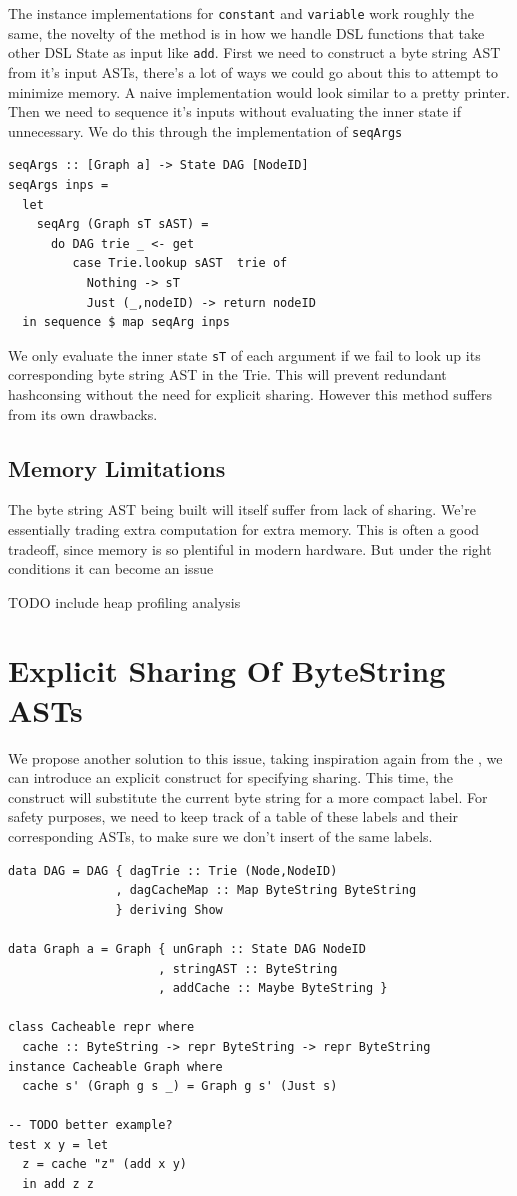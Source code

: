\documentclass[runningheads]{llncs}
\begin{document}
The instance implementations for \texttt{constant} and
\texttt{variable} work roughly the same, the novelty of the method
is in how we handle DSL functions that take other DSL State as input like
\texttt{add}. First we need to construct a byte string AST from
it's input ASTs, there's a lot of ways we could go about this to attempt to
minimize memory. A naive implementation would look similar to a pretty printer.
Then we need to sequence it's inputs without evaluating the inner state if
unnecessary. We do this through the implementation of \texttt{seqArgs}
\begin{verbatim}
seqArgs :: [Graph a] -> State DAG [NodeID]
seqArgs inps =
  let
    seqArg (Graph sT sAST) =
      do DAG trie _ <- get
         case Trie.lookup sAST  trie of
           Nothing -> sT
           Just (_,nodeID) -> return nodeID
  in sequence $ map seqArg inps
\end{verbatim}

We only evaluate the inner state \texttt{sT} of each argument if we
fail to look up its corresponding byte string AST in the Trie. This will prevent
redundant hashconsing without the need for explicit sharing. However this method
suffers from its own drawbacks.

\subsection{Memory Limitations}
The byte string AST being built will itself suffer from lack of sharing. We're
essentially trading extra computation for extra memory. This is often a good
tradeoff, since memory is so plentiful in modern hardware. But under the right
conditions it can become an issue

TODO include heap profiling analysis

\section{Explicit Sharing Of ByteString ASTs}
We propose another solution to this issue, taking inspiration again from the
\cite{kiselyov:sharing}, we can introduce an explicit construct for specifying
sharing. This time, the construct will substitute the current byte string for a
more compact label. For safety purposes, we need to keep track of a table of
these labels and their corresponding ASTs, to make sure we don't insert of the
same labels.
\begin{verbatim}
data DAG = DAG { dagTrie :: Trie (Node,NodeID)
               , dagCacheMap :: Map ByteString ByteString
               } deriving Show

data Graph a = Graph { unGraph :: State DAG NodeID
                     , stringAST :: ByteString
                     , addCache :: Maybe ByteString }

class Cacheable repr where
  cache :: ByteString -> repr ByteString -> repr ByteString
instance Cacheable Graph where
  cache s' (Graph g s _) = Graph g s' (Just s)

-- TODO better example?
test x y = let
  z = cache "z" (add x y)
  in add z z
\end{verbatim}
\end{document}
